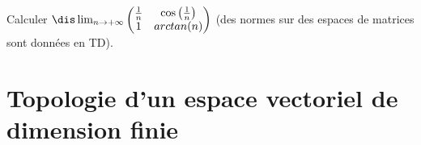 \documentclass[a4paper,10pt]{report}
\begin{document}
%
%
%
%
%
%
%
%
%
%
%

\begin{exa} Calculer $\dis \lim_{n \rightarrow + \infty} \begin{pmatrix}
\frac{1}{n} & \cos \left( \frac{1}{n} \right) \\
1 & arctan(n) \\
\end{pmatrix}$ (des normes sur des espaces de matrices sont données en TD).
\end{exa}

\section{Topologie d'un espace vectoriel de dimension finie}
\end{document}
